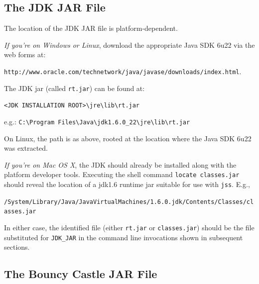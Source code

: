 \documentclass[11pt]{article}
\begin{document}
\subsection{The JDK JAR File}

The location of the JDK JAR file is platform-dependent.

\vspace{5mm}

\emph{If you're on Windows or Linux}, download the appropriate Java SDK
6u22 via the web forms at:

\begin{center}
\texttt{http://www.oracle.com/technetwork/java/javase/downloads/index.html}.
\end{center}

The JDK jar (called \texttt{rt.jar}) can be found at:

\begin{center}
\texttt{<JDK INSTALLATION ROOT>\textbackslash jre\textbackslash lib\textbackslash rt.jar}
\end{center}

e.g.: \texttt{C:\textbackslash Program Files\textbackslash Java\textbackslash jdk1.6.0\_22\textbackslash jre\textbackslash lib\textbackslash rt.jar}

\vspace{5mm}

On Linux, the path is as above, rooted at the location where the Java
SDK 6u22 was extracted.

\vspace{5mm}

\emph{If you're on Mac OS X}, the JDK should already be installed along
with the platform developer tools.  Executing the shell command
\texttt{locate classes.jar} should reveal the location of a jdk1.6
runtime jar suitable for use with \texttt{jss}.  E.g.,

\begin{center}
\texttt{/System/Library/Java/JavaVirtualMachines/1.6.0.jdk/Contents/Classes/classes.jar}
\end{center}

\vspace{5mm}

In either case, the identified file (either \texttt{rt.jar} or
\texttt{classes.jar}) should be the file substituted for
\texttt{JDK\_JAR} in the command line invocations shown in subsequent
sections.

\subsection{The Bouncy Castle JAR File}
\end{document}
